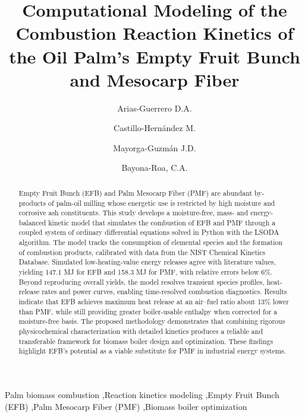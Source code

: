 \documentclass[preprint,12pt]{elsarticle}
\begin{document}
\begin{frontmatter}

\title{Computational Modeling of the Combustion Reaction Kinetics of the Oil Palm's Empty Fruit Bunch and Mesocarp Fiber}

\author[label1]{Arias-Guerrero D.A.}
\author[label1]{Castillo-Hernández M.}
\author[label1]{Mayorga-Guzmán J.D.}
\author[label1]{Bayona-Roa, C.A.}





\begin{abstract}
Empty Fruit Bunch (EFB) and Palm Mesocarp Fiber (PMF) are abundant by-products of palm-oil milling whose energetic use is restricted by high moisture and corrosive ash constituents. This study develops a moisture-free, mass- and energy-balanced kinetic model that simulates the combustion of EFB and PMF through a coupled system of ordinary differential equations solved in Python with the LSODA algorithm. The model tracks the consumption of elemental species and the formation of combustion products, calibrated with data from the NIST Chemical Kinetics Database. Simulated low-heating-value energy releases agree with literature values, yielding 147.1 MJ for EFB and 158.3 MJ for PMF, with relative errors below 6\%. Beyond reproducing overall yields, the model resolves transient species profiles, heat-release rates and power curves, enabling time-resolved combustion diagnostics. Results indicate that EFB achieves maximum heat release at an air–fuel ratio about 13\% lower than PMF, while still providing greater boiler-usable enthalpy when corrected for a moisture-free basis. The proposed methodology demonstrates that combining rigorous physicochemical characterization with detailed kinetics produces a reliable and transferable framework for biomass boiler design and optimization. These findings highlight EFB’s potential as a viable substitute for PMF in industrial energy systems.
\end{abstract}

\begin{keyword}
Palm biomass combustion \sep Reaction kinetics modeling \sep Empty Fruit Bunch (EFB) \sep Palm Mesocarp Fiber (PMF) \sep Biomass boiler optimization
\end{keyword}

\end{frontmatter}
\end{document}
